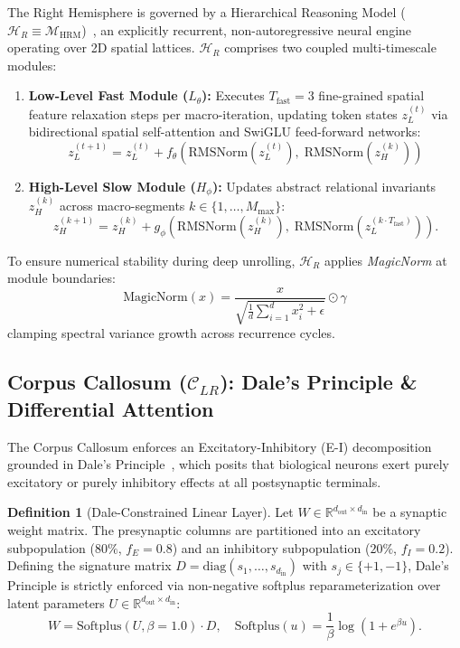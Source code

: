 \documentclass[11pt,a4paper]{article}
\theoremstyle{plain}
\theoremstyle{definition}
\newtheorem{definition}[theorem]{Definition}
\theoremstyle{remark}
\newcommand{\HR}{\mathcal{H}_R}
\newcommand{\CC}{\mathcal{C}_{LR}}
\newcommand{\diag}{\mathrm{diag}}
\newcommand{\Softplus}{\mathrm{Softplus}}
\newcommand{\RMSNorm}{\mathrm{RMSNorm}}
\begin{document}
The Right Hemisphere is governed by a Hierarchical Reasoning Model ($\HR \equiv \mathcal{M}_{\mathrm{HRM}}$)~\cite{wang2025hrm}, an explicitly recurrent, non-autoregressive neural engine operating over 2D spatial lattices. $\HR$ comprises two coupled multi-timescale modules:
\begin{enumerate}
    \item \textbf{Low-Level Fast Module ($L_\theta$):} Executes $T_{\mathrm{fast}} = 3$ fine-grained spatial feature relaxation steps per macro-iteration, updating token states $z_L^{(t)}$ via bidirectional spatial self-attention and SwiGLU feed-forward networks:
    \begin{equation}
        z_L^{(t+1)} = z_L^{(t)} + f_\theta\left( \RMSNorm(z_L^{(t)}), \; \RMSNorm(z_H^{(k)}) \right)
    \end{equation}
    \item \textbf{High-Level Slow Module ($H_\phi$):} Updates abstract relational invariants $z_H^{(k)}$ across macro-segments $k \in \{1, \dots, M_{\max}\}$:
    \begin{equation}
        z_H^{(k+1)} = z_H^{(k)} + g_\phi\left( \RMSNorm(z_H^{(k)}), \; \RMSNorm(z_L^{(k \cdot T_{\mathrm{fast}})}) \right).
    \end{equation}
\end{enumerate}

To ensure numerical stability during deep unrolling, $\HR$ applies \emph{MagicNorm} at module boundaries:
\begin{equation}
    \mathrm{MagicNorm}(x) = \frac{x}{\sqrt{\frac{1}{d} \sum_{i=1}^d x_i^2 + \epsilon}} \odot \gamma
\end{equation}
clamping spectral variance growth across recurrence cycles.

\subsection{Corpus Callosum ($\CC$): Dale's Principle \& Differential Attention}

The Corpus Callosum enforces an Excitatory-Inhibitory (E-I) decomposition grounded in Dale's Principle~\cite{eccles1954dale}, which posits that biological neurons exert purely excitatory or purely inhibitory effects at all postsynaptic terminals.

\begin{definition}[Dale-Constrained Linear Layer]
Let $W \in \mathbb{R}^{d_{\mathrm{out}} \times d_{\mathrm{in}}}$ be a synaptic weight matrix. The presynaptic columns are partitioned into an excitatory subpopulation ($80\%$, $f_E = 0.8$) and an inhibitory subpopulation ($20\%$, $f_I = 0.2$). Defining the signature matrix $D = \diag(s_1, \dots, s_{d_{\mathrm{in}}})$ with $s_j \in \{+1, -1\}$, Dale's Principle is strictly enforced via non-negative softplus reparameterization over latent parameters $U \in \mathbb{R}^{d_{\mathrm{out}} \times d_{\mathrm{in}}}$:
\begin{equation}
    W = \Softplus(U, \beta=1.0) \cdot D, \quad \Softplus(u) = \frac{1}{\beta} \log(1 + e^{\beta u}).
\end{equation}
\end{definition}
\end{document}
